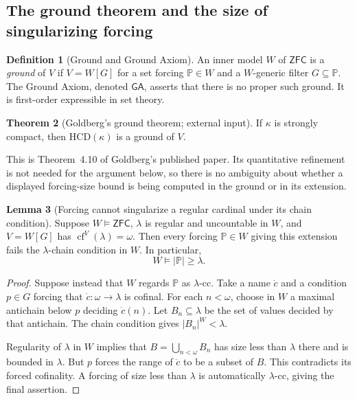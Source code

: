 \documentclass[11pt,letterpaper]{article}
\theoremstyle{definition}
\newtheorem{definition}{Definition}[section]
\newtheorem{theorem}[definition]{Theorem}
\newtheorem{lemma}[definition]{Lemma}
\newcommand{\ZFC}{\mathsf{ZFC}}
\newcommand{\cf}{\operatorname{cf}}
\newcommand{\HCD}{\mathrm{HCD}}
\newcommand{\GA}{\mathsf{GA}}
\begin{document}
\subsection{The ground theorem and the size of singularizing forcing}

\begin{definition}[Ground and Ground Axiom]
An inner model $W$ of $\ZFC$ is a \emph{ground} of $V$ if $V=W[G]$ for a set forcing $\mathbb P\in W$ and a $W$-generic filter $G\subseteq\mathbb P$. The Ground Axiom, denoted $\GA$, asserts that there is no proper such ground. It is first-order expressible in set theory.\cite{reitz}
\end{definition}

\begin{theorem}[Goldberg's ground theorem; external input]\label{thm:goldbergground}
If $\kappa$ is strongly compact, then $\HCD(\kappa)$ is a ground of $V$.
\end{theorem}

This is Theorem~4.10 of Goldberg's published paper.\cite{uniqueness} Its quantitative refinement is not needed for the argument below, so there is no ambiguity about whether a displayed forcing-size bound is being computed in the ground or in its extension.

\begin{lemma}[Forcing cannot singularize a regular cardinal under its chain condition]\label{lem:forcing}
Suppose $W\models\ZFC$, $\lambda$ is regular and uncountable in $W$, and $V=W[G]$ has $\cf^V(\lambda)=\omega$. Then every forcing $\mathbb P\in W$ giving this extension fails the $\lambda$-chain condition in $W$. In particular,
\[
 W\models |\mathbb P|\geq\lambda.
\]
\end{lemma}

\begin{proof}
Suppose instead that $W$ regards $\mathbb P$ as $\lambda$-cc. Take a name $\dot c$ and a condition $p\in G$ forcing that $\dot c:\omega\to\lambda$ is cofinal. For each $n<\omega$, choose in $W$ a maximal antichain below $p$ deciding $\dot c(n)$. Let $B_n\subseteq\lambda$ be the set of values decided by that antichain. The chain condition gives $|B_n|^W<\lambda$.

Regularity of $\lambda$ in $W$ implies that $B=\bigcup_{n<\omega}B_n$ has size less than $\lambda$ there and is bounded in $\lambda$. But $p$ forces the range of $\dot c$ to be a subset of $B$. This contradicts its forced cofinality. A forcing of size less than $\lambda$ is automatically $\lambda$-cc, giving the final assertion.
\end{proof}
\end{document}
